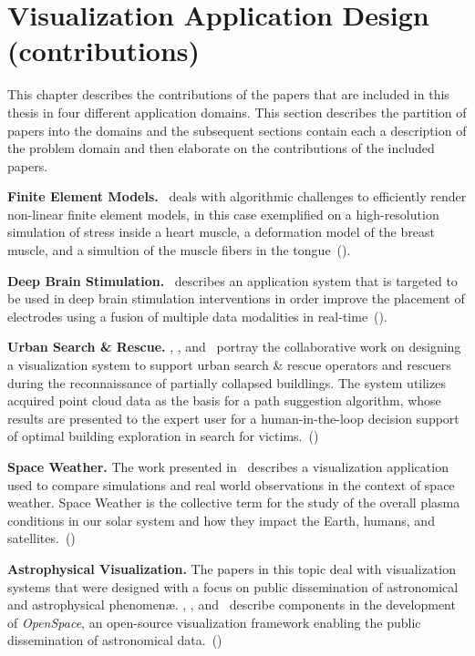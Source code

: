 
\chapter{Visualization Application Design (contributions)} \label{cha:contributions}

This chapter describes the contributions of the papers that are included in this thesis in four different application domains.  This section describes the partition of papers into the domains and the subsequent sections contain each a description of the problem domain and then elaborate on the contributions of the included papers.

\textbf{Finite Element Models. } \paperFEM\ deals with algorithmic challenges to efficiently render non-linear finite element models, in this case exemplified on a high-resolution simulation of stress inside a heart muscle, a deformation model of the breast muscle, and a simultion of the muscle fibers in the tongue~().

\textbf{Deep Brain Stimulation. } \paperDBS\ describes an application system that is targeted to be used in deep brain stimulation interventions in order improve the placement of electrodes using a fusion of multiple data modalities in real-time~().

\textbf{Urban Search \& Rescue. } \paperVMV, \paperSSRR, and \paperCGF\ portray the collaborative work on designing a visualization system to support urban search \& rescue operators and rescuers during the reconnaissance of partially collapsed buildlings.  The system utilizes acquired  point cloud data as the basis for a path suggestion algorithm, whose results are presented to the expert user for a human-in-the-loop decision support of optimal building exploration in search for victims.~()

\textbf{Space Weather. } The work presented in \paperCME\ describes a visualization application used to compare simulations and real world observations in the context of space weather.  Space Weather is the collective term for the study of the overall plasma conditions in our solar system and how they impact the Earth, humans, and satellites.~()

\textbf{Astrophysical Visualization. } The papers in this topic deal with visualization systems that were designed with a focus on public dissemination of astronomical and astrophysical phenomen\ae. \paperDSG, \paperGB, and \paperOS\ describe components in the development of \emph{OpenSpace}, an open-source visualization framework enabling the public dissemination of astronomical data.~()

